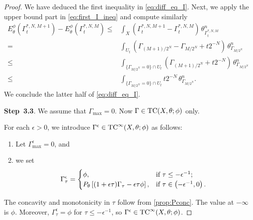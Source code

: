 \begin{proof}
     We have deduced the first inequality in \eqref{eq:diff_eq_I}. Next, we apply the upper bound part in \eqref{eq:first_I_ineq} and compute similarly
     \[
     \begin{aligned}
     E_{\theta}^{\phi}(\Gamma_t^{*,N,M+1})-E_{\theta}^{\phi}(\Gamma_t^{*,N,M})\leq & \int_X \left(\Gamma_t^{*,N,M+1}-\Gamma_t^{*,N,M}\right)\,\theta^n_{\Gamma_t^{*,N,M}}\\
     =& \int_{U_t} \left(\Gamma_{(M+1)/2^N}-\Gamma_{M/2^N}+t2^{-N}\right)\,\theta^n_{\Gamma_{M/2^N}}\\
     \leq & \int_{\{\Gamma_{M/2^N}=0\}\cap U_t}\left(\Gamma_{(M+1)/2^N}+t2^{-N}\right)\,\theta^n_{\Gamma_{M/2^N}} \\
     \leq &\int_{\{\Gamma_{M/2^N}=0\}\cap U_t} t2^{-N}\,\theta^n_{\Gamma_{M/2^N}}.
     \end{aligned}
     \]
     We conclude the latter half of \eqref{eq:diff_eq_I}.

    \textbf{Step~3.3}. We assume that $\Gamma_{\max}=0$. Now $\Gamma\in \mathrm{TC}(X,\theta;\phi)$ only.

    For each $\epsilon>0$, we introduce $\Gamma^{\epsilon}\in \mathrm{TC}^{\infty}(X,\theta;\phi)$ as follows:
    \begin{enumerate}
        \item\label{itm:chapter-testcurve:L718:1} Let $\Gamma^{\epsilon}_{\max}=0$, and
        \item\label{itm:chapter-testcurve:L718:2} we set
        \[
        \Gamma^{\epsilon}_{\tau}=
        \begin{cases}
            \phi,&\textup{if }\tau\leq -\epsilon^{-1};\\
            P_{\theta}\left[ (1+\epsilon\tau)\Gamma_{\tau}-\epsilon\tau \phi \right],&\textup{if }\tau\in \left(-\epsilon^{-1},0\right).
        \end{cases}
        \]
    \end{enumerate}
    The concavity and monotonicity in $\tau$ follow from \cref{prop:Pconc}. The value at $-\infty$ is $\phi$. Moreover, $\Gamma^\epsilon_\tau=\phi$ for $\tau\leq-\epsilon^{-1}$, so $\Gamma^\epsilon\in\mathrm{TC}^\infty(X,\theta;\phi)$.


\end{proof}
